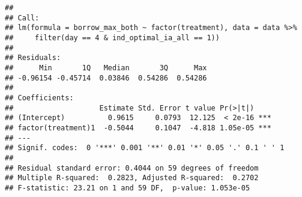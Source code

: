 \documentclass[
]{article}
\begin{document}
\begin{verbatim}
## 
## Call:
## lm(formula = borrow_max_both ~ factor(treatment), data = data %>% 
##     filter(day == 4 & ind_optimal_ia_all == 1))
## 
## Residuals:
##      Min       1Q   Median       3Q      Max 
## -0.96154 -0.45714  0.03846  0.54286  0.54286 
## 
## Coefficients:
##                    Estimate Std. Error t value Pr(>|t|)    
## (Intercept)          0.9615     0.0793  12.125  < 2e-16 ***
## factor(treatment)1  -0.5044     0.1047  -4.818 1.05e-05 ***
## ---
## Signif. codes:  0 '***' 0.001 '**' 0.01 '*' 0.05 '.' 0.1 ' ' 1
## 
## Residual standard error: 0.4044 on 59 degrees of freedom
## Multiple R-squared:  0.2823, Adjusted R-squared:  0.2702 
## F-statistic: 23.21 on 1 and 59 DF,  p-value: 1.053e-05
\end{verbatim}
\end{document}
